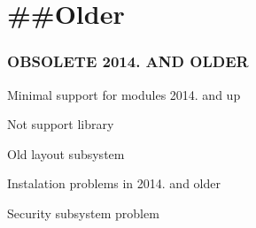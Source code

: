 \section*{\#\#\-Older }

\subsubsection*{O\-B\-S\-O\-L\-E\-T\-E 2014. A\-N\-D O\-L\-D\-E\-R}


\begin{DoxyEnumerate}
\item Minimal support for modules 2014. and up
\item Not support library
\item Old layout subsystem
\item Instalation problems in 2014. and older
\item Security subsystem problem 
\end{DoxyEnumerate}